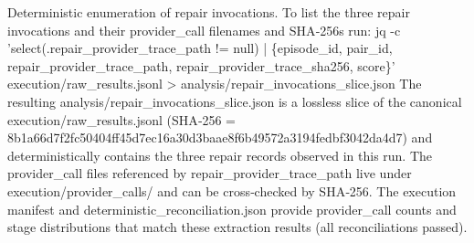 \documentclass[conference]{IEEEtran}
\begin{document}
Deterministic enumeration of repair invocations. To list the three repair invocations and their provider\_call filenames and SHA‑256s run:
   jq -c 'select(.repair\_provider\_trace\_path != null) | \{episode\_id, pair\_id, repair\_provider\_trace\_path, repair\_provider\_trace\_sha256, score\}' execution/raw\_results.jsonl > analysis/repair\_invocations\_slice.json
The resulting analysis/repair\_invocations\_slice.json is a lossless slice of the canonical execution/raw\_results.jsonl (SHA‑256 = 8b1a66d7f2fc50404ff45d7ec16a30d3baae8f6b49572a3194fedbf3042da4d7) and deterministically contains the three repair records observed in this run. The provider\_call files referenced by repair\_provider\_trace\_path live under execution/provider\_calls/ and can be cross‑checked by SHA‑256. The execution manifest and deterministic\_reconciliation.json provide provider\_call counts and stage distributions that match these extraction results (all reconciliations passed).
\end{document}
